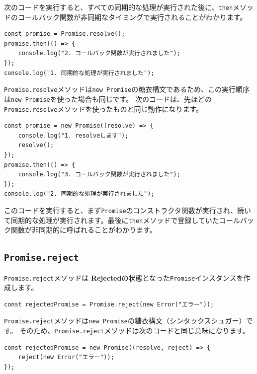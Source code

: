 次のコードを実行すると、すべての同期的な処理が実行された後に、\texttt{then}メソッドのコールバック関数が非同期なタイミングで実行されることがわかります。

\begin{lstlisting}
const promise = Promise.resolve();
promise.then(() => {
    console.log("2. コールバック関数が実行されました");
});
console.log("1. 同期的な処理が実行されました");
\end{lstlisting}

\texttt{Promise.resolve}メソッドは\texttt{new Promise}の糖衣構文であるため、この実行順序は\texttt{new Promise}を使った場合も同じです。
次のコードは、先ほどの\texttt{Promise.resolve}メソッドを使ったものと同じ動作になります。

\begin{lstlisting}
const promise = new Promise((resolve) => {
    console.log("1. resolveします");
    resolve();
});
promise.then(() => {
    console.log("3. コールバック関数が実行されました");
});
console.log("2. 同期的な処理が実行されました");
\end{lstlisting}

このコードを実行すると、まず\texttt{Promise}のコンストラクタ関数が実行され、続いて同期的な処理が実行されます。最後に\texttt{then}メソッドで登録していたコールバック関数が非同期的に呼ばれることがわかります。

\hypertarget{promise-reject}{%
\subsection{\texorpdfstring{\texttt{Promise.reject}}{Promise.reject}}\label{promise-reject}}

\texttt{Promise.reject}メソッドは
\textbf{Rejected}の状態となった\texttt{Promise}インスタンスを作成します。

\begin{lstlisting}
const rejectedPromise = Promise.reject(new Error("エラー"));
\end{lstlisting}

\texttt{Promise.reject}メソッドは\texttt{new Promise}の糖衣構文（シンタックスシュガー）です。
そのため、\texttt{Promise.reject}メソッドは次のコードと同じ意味になります。
\newpage
\begin{lstlisting}
const rejectedPromise = new Promise((resolve, reject) => {
    reject(new Error("エラー"));
});
\end{lstlisting}

